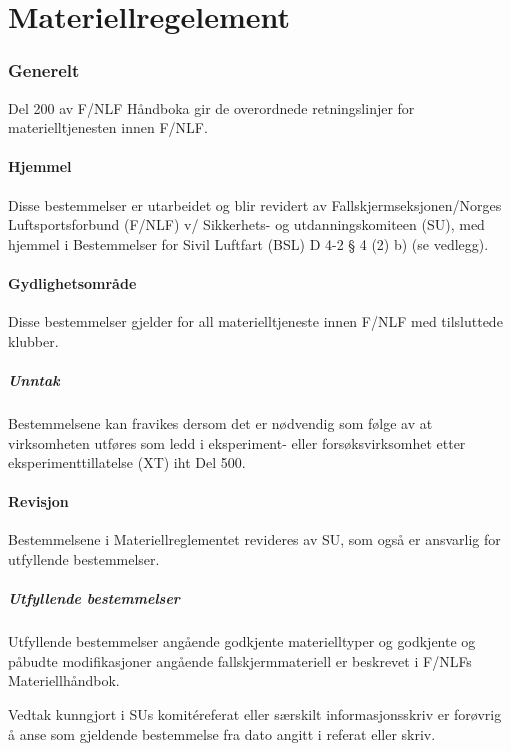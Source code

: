 \part{Materiellregelement}
\setcounter{section}{200}

\section{Generelt}
Del 200 av F/NLF Håndboka gir de overordnede retningslinjer for materielltjenesten innen F/NLF.

\subsection{Hjemmel}
Disse bestemmelser er utarbeidet og blir revidert av Fallskjermseksjonen/Norges Luftsportsforbund (F/NLF) v/ Sikkerhets- og utdanningskomiteen (SU), med hjemmel i Bestemmelser for Sivil Luftfart (BSL) D 4-2 § 4 (2) b) (se vedlegg).

\subsection{Gydlighetsområde}
Disse bestemmelser gjelder for all materielltjeneste innen F/NLF med tilsluttede klubber.

\subsubsection{Unntak}
Bestemmelsene kan fravikes dersom det er nødvendig som følge av at virksomheten utføres som ledd i eksperiment- eller forsøksvirksomhet etter eksperimenttillatelse (XT) iht Del 500.

\subsection{Revisjon}
Bestemmelsene i Materiellreglementet revideres av SU, som også er ansvarlig for utfyllende bestemmelser.

\subsubsection{Utfyllende bestemmelser}
Utfyllende bestemmelser angående godkjente materielltyper og godkjente og påbudte modifikasjoner angående fallskjermmateriell er beskrevet i F/NLFs Materiellhåndbok.

Vedtak kunngjort i SUs komitéreferat eller særskilt informasjonsskriv er forøvrig å anse som gjeldende bestemmelse fra dato angitt i referat eller skriv.

